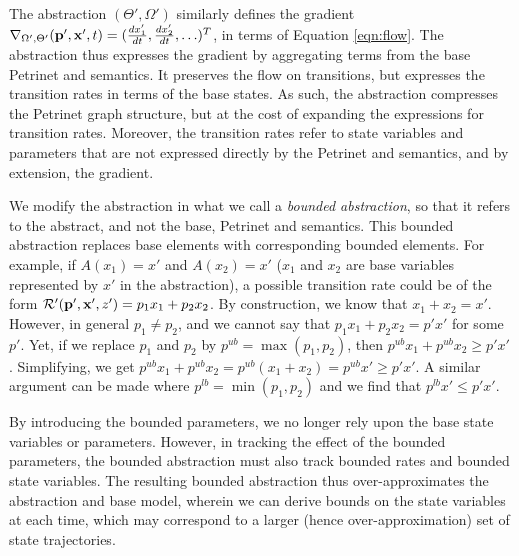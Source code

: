 The abstraction $(\Theta', \Omega')$ similarly defines the gradient $\nabla_{\Omega', \Theta'}({\bf p}', {\bf x}', t) = (\frac{dx_1'}{dt},
\frac{dx_2'}{dt}, \ldots)^T$, in terms of Equation \ref{eqn:flow}.
The abstraction thus expresses the gradient by aggregating terms from the
base Petrinet and semantics.  It preserves the flow on transitions, but
expresses the transition rates in terms of the base states.  As such, the
abstraction compresses the Petrinet graph structure, but at the cost of
expanding the expressions for transition rates. Moreover, the transition
rates refer to state variables and parameters that are not expressed
directly by the Petrinet and semantics, and by extension, the gradient. 

We modify the abstraction in what we call a \emph{bounded abstraction}, so that
it refers to the abstract, and not the base, Petrinet and semantics.  This
bounded abstraction replaces base elements with corresponding bounded elements.
For example, if $A(x_1) = x'$ and $A(x_2) = x'$ ($x_1$ and $x_2$ are base
variables represented by $x'$ in the abstraction), a possible transition rate
could be of the form
${\cal R}'({\bf p}', {\bf x}', z') = p_1 x_1 + p_2 x_2$.  By construction, we
know that $x_1 + x_2 = x'$.  However, in general $p_1 \not= p_2$, and we cannot
say that $p_1 x_1 + p_2 x_2 = p'x'$ for some $p'$.  Yet, if we replace $p_1$ and
$p_2$ by $p^{ub} = \max(p_1, p_2)$, then $p^{ub} x_1 + p^{ub} x_2 \geq p'x'$.  Simplifying, we
get $p^{ub} x_1 + p^{ub} x_2 = p^{ub}(x_1 + x_2) = p^{ub} x' \geq p'x'$.  A
similar argument can be made where $p^{lb} = \min(p_1, p_2)$ and we find that
$p^{lb} x' \leq p'x'$.  

By introducing the bounded parameters, we no longer
rely upon the base state variables or parameters.  However, in tracking the
effect of the bounded
parameters, the bounded abstraction must also track bounded rates and bounded
state variables.  The resulting bounded abstraction thus over-approximates the
abstraction and base model, wherein we can derive bounds on the state variables
at each time, which may correspond to a larger (hence over-approximation) set of
state trajectories.

